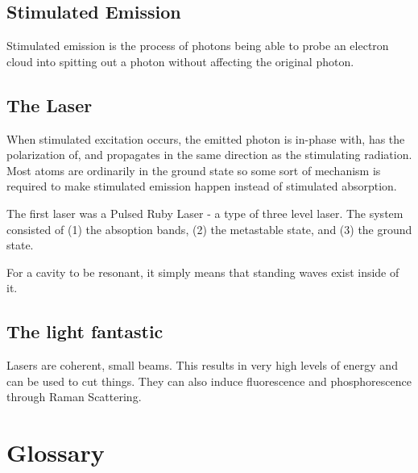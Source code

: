 \documentclass[12pt]{report}
\begin{document}
\subsection{Stimulated Emission}
Stimulated emission is the process of photons being able to probe an electron cloud into spitting out a photon without affecting the original photon. 

\subsection{The Laser}
When stimulated excitation occurs, the emitted photon is in-phase with, has the polarization of, and propagates in the same direction as the stimulating radiation. Most atoms are ordinarily in the ground state so some sort of mechanism is required to make stimulated emission happen instead of stimulated absorption. 

The first laser was a Pulsed Ruby Laser - a type of three level laser. The system consisted of (1) the absoption bands, (2) the metastable state, and (3) the ground state. 

For a cavity to be resonant, it simply means that standing waves exist inside of it.

\subsection{The light fantastic}
Lasers are coherent, small beams. This results in very high levels of energy and can be used to cut things. They can also induce fluorescence and phosphorescence through Raman Scattering. 

 

\section{Glossary}
\end{document}
